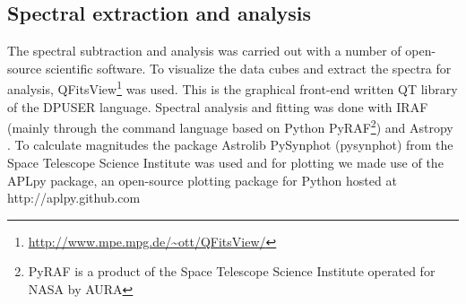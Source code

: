 \subsection{Spectral extraction and analysis}

The spectral subtraction and analysis was carried out with a number of open-source scientific software. To visualize the data cubes and extract the spectra for analysis, QFitsView\footnote{\url{http://www.mpe.mpg.de/~ott/QFitsView/}} was used. This is the graphical front-end written QT library of the DPUSER language. Spectral analysis and fitting was done with IRAF \citep{1986SPIE..627..733T} (mainly through the command language based on Python PyRAF\footnote{PyRAF is a product of the Space Telescope Science Institute operated for NASA by AURA}) and Astropy \citep{astropy_collaboration_2013}. To calculate magnitudes the package Astrolib PySynphot (pysynphot) from the Space Telescope Science Institute was used \citep{pysynphot} and for plotting we made use of the APLpy package, an open-source plotting package for Python hosted at http://aplpy.github.com

